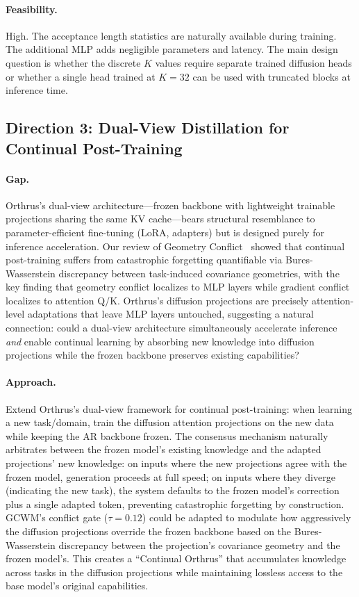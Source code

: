 \documentclass[11pt,a4paper]{article}
\begin{document}
\paragraph{Feasibility.} High. The acceptance length statistics are naturally available during training. The additional MLP adds negligible parameters and latency. The main design question is whether the discrete $K$ values require separate trained diffusion heads or whether a single head trained at $K{=}32$ can be used with truncated blocks at inference time.

\subsection{Direction 3: Dual-View Distillation for Continual Post-Training}

\paragraph{Gap.} Orthrus's dual-view architecture---frozen backbone with lightweight trainable projections sharing the same KV cache---bears structural resemblance to parameter-efficient fine-tuning (LoRA, adapters) but is designed purely for inference acceleration. Our review of Geometry Conflict~\cite{geometryconflict} showed that continual post-training suffers from catastrophic forgetting quantifiable via Bures-Wasserstein discrepancy between task-induced covariance geometries, with the key finding that geometry conflict localizes to MLP layers while gradient conflict localizes to attention Q/K. Orthrus's diffusion projections are precisely attention-level adaptations that leave MLP layers untouched, suggesting a natural connection: could a dual-view architecture simultaneously accelerate inference \textit{and} enable continual learning by absorbing new knowledge into diffusion projections while the frozen backbone preserves existing capabilities?

\paragraph{Approach.} Extend Orthrus's dual-view framework for continual post-training: when learning a new task/domain, train the diffusion attention projections on the new data while keeping the AR backbone frozen. The consensus mechanism naturally arbitrates between the frozen model's existing knowledge and the adapted projections' new knowledge: on inputs where the new projections agree with the frozen model, generation proceeds at full speed; on inputs where they diverge (indicating the new task), the system defaults to the frozen model's correction plus a single adapted token, preventing catastrophic forgetting by construction. GCWM's conflict gate ($\tau{=}0.12$) could be adapted to modulate how aggressively the diffusion projections override the frozen backbone based on the Bures-Wasserstein discrepancy between the projection's covariance geometry and the frozen model's. This creates a ``Continual Orthrus'' that accumulates knowledge across tasks in the diffusion projections while maintaining lossless access to the base model's original capabilities.
\end{document}
